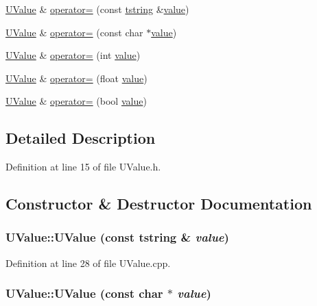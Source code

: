 \begin{CompactItemize}
\item 
\hyperlink{class_u_value}{UValue} \& \hyperlink{class_u_value_29e11fbc8f0f6a4c24d6c9fdf0035deb}{operator=} (const \hyperlink{common__afx_8h_816fa58fd77499b0edb2c69ebe803d5c}{tstring} \&\hyperlink{glext__bak_8h_6a4f8a1a444e9080b297963b3db29fe0}{value})
\item 
\hyperlink{class_u_value}{UValue} \& \hyperlink{class_u_value_b0cd1a325bc763e974ca819bc64d2ac1}{operator=} (const char $\ast$\hyperlink{glext__bak_8h_6a4f8a1a444e9080b297963b3db29fe0}{value})
\item 
\hyperlink{class_u_value}{UValue} \& \hyperlink{class_u_value_99588b29942a28c5c26325e28ca1757f}{operator=} (int \hyperlink{glext__bak_8h_6a4f8a1a444e9080b297963b3db29fe0}{value})
\item 
\hyperlink{class_u_value}{UValue} \& \hyperlink{class_u_value_17116023ffecbf9d8c8949fe0b2121d3}{operator=} (float \hyperlink{glext__bak_8h_6a4f8a1a444e9080b297963b3db29fe0}{value})
\item 
\hyperlink{class_u_value}{UValue} \& \hyperlink{class_u_value_f9d78d0bae741a67a8b720ec60beb86c}{operator=} (bool \hyperlink{glext__bak_8h_6a4f8a1a444e9080b297963b3db29fe0}{value})
\end{CompactItemize}


\subsection{Detailed Description}


Definition at line 15 of file UValue.h.

\subsection{Constructor \& Destructor Documentation}
\hypertarget{class_u_value_c0a4bfe947980cb74ad336454c30f7c0}{
\subsubsection[{UValue}]{\setlength{\rightskip}{0pt plus 5cm}UValue::UValue (const {\bf tstring} \& {\em value})}}
\label{class_u_value_c0a4bfe947980cb74ad336454c30f7c0}




Definition at line 28 of file UValue.cpp.\hypertarget{class_u_value_87fe93c363d158376139a5c1fc04fb90}{
\subsubsection[{UValue}]{\setlength{\rightskip}{0pt plus 5cm}UValue::UValue (const char $\ast$ {\em value})}}
\label{class_u_value_87fe93c363d158376139a5c1fc04fb90}




